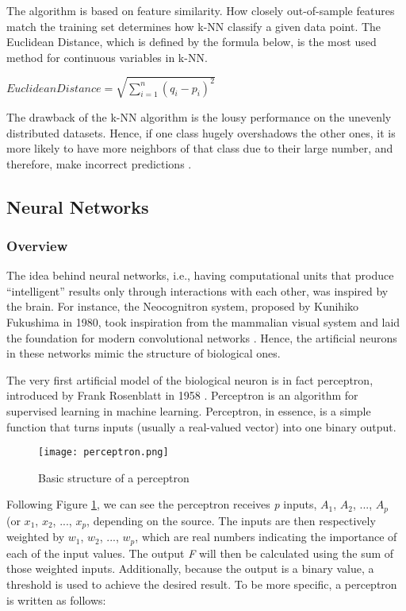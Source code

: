 The algorithm is based on feature similarity. 
How closely out-of-sample features match the training set determines how k-NN classify a given data point.
The Euclidean Distance,  which is defined by the formula below, is the most used method for continuous variables in k-NN.

\begin{center}
$EuclideanDistance =  \sqrt{ \sum_{i=1}^{n}(q_i - p_i)^2 }$
\end{center}

The drawback of the k-NN algorithm is the lousy performance on the unevenly distributed datasets. 
Hence, if one class hugely overshadows the other ones, it is more likely to have more neighbors of that class due to their large number, and therefore, make incorrect predictions \cite{laaksonen1996classification}.

\subsection{Neural Networks}

\subsubsection{Overview}

The idea behind neural networks, i.e., having computational units that produce “intelligent” results only through interactions with each other, was inspired by the brain. 
For instance, the Neocognitron system, proposed by Kunihiko Fukushima in 1980, took inspiration from the mammalian visual system and laid the foundation for modern convolutional networks \cite{goodfellow2016deep}. 
Hence, the artificial neurons in these networks mimic the structure of biological ones. 

The very first artificial model of the biological neuron is in fact perceptron, introduced by Frank Rosenblatt in 1958 \cite{rosenblatt1958perceptron}. 
Perceptron is an algorithm for supervised learning in machine learning. Perceptron, in essence, is a simple function that turns inputs (usually a real-valued vector) into one binary output.

\begin{figure}[htbp!] 
\centering    
\texttt{[image: perceptron.png]}
\caption{Basic structure of a perceptron \cite{minsky1969perceptron}}
\label{fig:perceptron}
\end{figure}

Following Figure \ref{fig:perceptron}, we can see the perceptron receives \textit{p} inputs, $A_1$, $A_2$, ..., $A_p$ (or $x_1$, $x_2$, ..., $x_p$, depending on the source. 
The inputs are then respectively weighted by $w_1$, $w_2$, ..., $w_p$, which are real numbers indicating the importance of each of the input values. The output \textit{F} will then be calculated using the sum of those weighted inputs. 
Additionally, because the output is a binary value, a threshold is used to achieve the desired result. To be more specific, a perceptron is written as follows:

